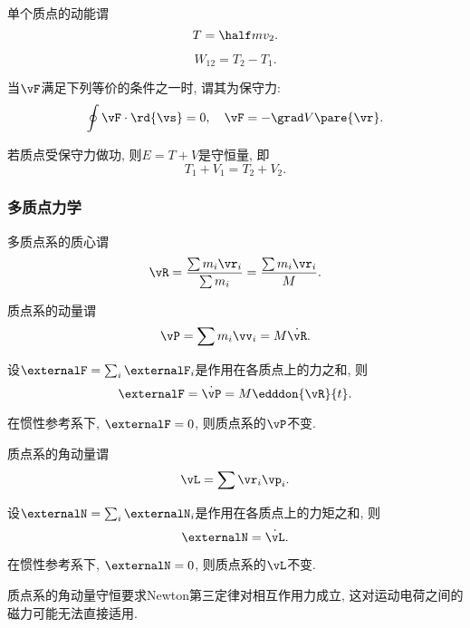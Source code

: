 \documentclass[../TheoreticalMechanics.tex]{subfiles}
\begin{document}
\begin{definition}[动能]
	单个质点的动能谓
	\[ T = \half mv_2. \]
\end{definition}
\begin{corollary}[功能原理]\quad
	\[ W_{12} = T_2 - T_1. \]
\end{corollary}
\begin{definition}
	当$\vF$满足下列等价的条件之一时, 谓其为保守力:
	\[ \oint \vF\cdot\rd{\vs} = 0,\quad \vF = -\grad V\pare{\vr}. \]
\end{definition}
\begin{corollary}[机械能守恒定律]
	若质点受保守力做功, 则$E=T+V$是守恒量, 即
	\[ T_1 + V_1 = T_2 + V_2. \]
\end{corollary}


\subsubsection{多质点力学} %
\label{ssub:多质点力学}

\begin{definition}[质心]
	多质点系的质心谓
	\[ \vR = \frac{\sum m_i \vr_i}{\sum m_i} = \frac{\sum m_i \vr_i}{M}. \]
\end{definition}
\begin{definition}[质点系的动量]
	质点系的动量谓
	\[ \vP = \sum m_i \vv_i = M\dot{\vR}. \]	
\end{definition}
\begin{corollary}[质点系的动量定理]
	设$\externalF = \sum_i \externalF_i$是作用在各质点上的力之和, 则
	\[ \externalF = \dot{\vP} = M\edddon{\vR}{t}. \]
\end{corollary}
\begin{corollary}[质点系的动量守恒]
	在惯性参考系下, $\externalF=0$, 则质点系的$\vP$不变.
\end{corollary}
\begin{definition}[质点系的角动量]
	质点系的角动量谓
	\[ \vL = \sum \vr_i\vp_i. \]	
\end{definition}
\begin{corollary}[质点系的角动量定理]
	设$\externalN = \sum_i \externalN_i$是作用在各质点上的力矩之和, 则
	\[ \externalN = \dot{\vL}. \]
\end{corollary}
\begin{corollary}[质点系的角动量守恒]
	在惯性参考系下, $\externalN=0$, 则质点系的$\vL$不变.
\end{corollary}
\begin{pitfall}
	质点系的角动量守恒要求Newton第三定律对相互作用力成立, 这对运动电荷之间的磁力可能无法直接适用.
\end{pitfall}
\end{document}
